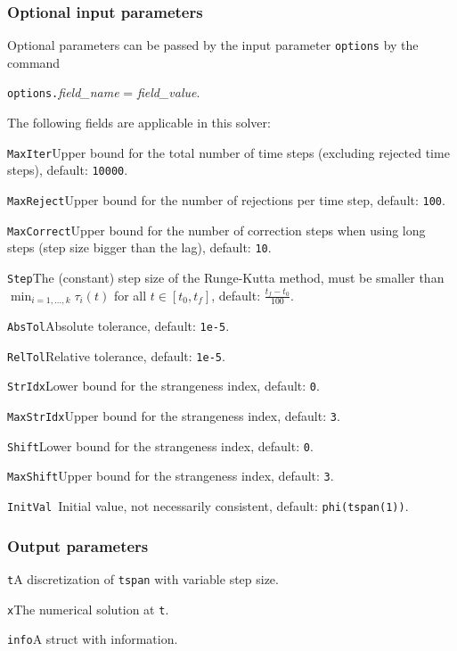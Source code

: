\documentclass[final,reqno]{siamltex}
\renewenvironment{itemize}[1]{\begin{compactitem}#1}{\end{compactitem}}
\begin{document}
\subsubsection{Optional input parameters}
Optional parameters can be passed by the input parameter {\tt options} by the command 
\begin{center}
{\tt options.}{\it field\_name} = {\it field\_value}.
\end{center}
The following fields are applicable in this solver:
\begin{itemize}
\item {\tt MaxIter}\quad        Upper bound for the total number of time steps (excluding 
	rejected time steps), default: {\tt 10000}.
\item {\tt MaxReject}\quad      Upper bound for the number of rejections per time step, default: {\tt 100}.
\item{\tt MaxCorrect}\quad  Upper bound for the number of correction steps when using
         long steps (step size bigger than the lag), default: {\tt10}.
\item {\tt Step}\quad        The (constant) step size of the Runge-Kutta method, must be smaller than
          $\min_{i=1,\ldots,k}\tau_i(t)$ for all $t\in[t_0,t_f]$, default: $\frac{t_f-t_0}{100}$.
\item {\tt AbsTol}\quad       Absolute tolerance, default:  {\tt 1e-5}.
\item {\tt RelTol}\quad       Relative tolerance, default:  {\tt 1e-5}.
\item {\tt StrIdx}\quad       Lower bound for the strangeness index,  default: {\tt 0}.
\item {\tt MaxStrIdx}\quad    Upper bound for the strangeness index,  default: {\tt 3}.
\item {\tt Shift}\quad       Lower bound for the strangeness index,  default: {\tt 0}.
\item {\tt MaxShift}\quad    Upper bound for the strangeness index,  default: {\tt 3}.
\item {\tt InitVal  }\quad    Initial value, not necessarily consistent,  default: {\tt phi(tspan(1))}.
\end{itemize}

\subsubsection{Output parameters}
\begin{itemize}
\item {\tt t}\quad A discretization of {\tt tspan} with variable step size.
\item {\tt x}\quad The numerical solution at {\tt t}.
\item {\tt info}\quad A struct with information.
\end{itemize}
\end{document}
